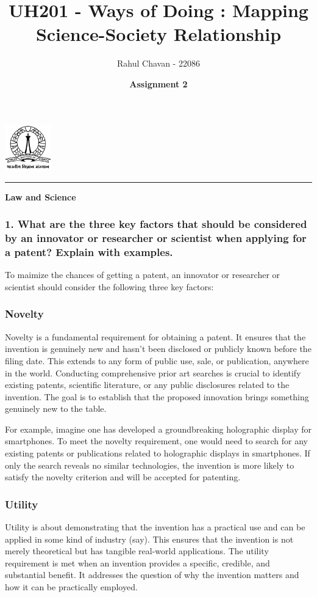 \documentclass{report}
\title{\textbf{UH201 - Ways of Doing : Mapping Science-Society Relationship}}
\author{Rahul Chavan - 22086}
\date{\textbf{Assignment 2}}
\renewcommand{\maketitle}{
 \begin{center}
    \includegraphics[width=2cm]{IISc_Master_Seal_Black.jpg}
    \vspace{0.5cm}

    \Large
    \textbf{\thetitle}
    
    \vspace{0.5cm}
    
    \Large
    \theauthor
    
    \vspace{0.2cm}
    
    \large
    \thedate

    \vspace{0.5cm}

    \hrule  
    
  \end{center}
}
\begin{document}
\maketitle
\begin{center}
    \Large
    \textbf{Law and Science}
\end{center} 

\subsubsection*{1. What are the three key factors that should be considered by an
innovator or researcher or scientist when applying for a patent?
Explain with examples.}

To maimize the chances of getting a patent, an innovator or researcher or scientist should consider the following three key factors:

\subsubsection*{Novelty}
Novelty is a fundamental requirement for obtaining a patent. It ensures that the invention is genuinely new and hasn't 
been disclosed or publicly known before the filing date. This extends to any form of public use, sale, or publication, 
anywhere in the world. Conducting comprehensive prior art searches is crucial to identify existing patents, scientific 
literature, or any public disclosures related to the invention. The goal is to establish that the proposed innovation 
brings something genuinely new to the table.

For example, imagine one has developed a groundbreaking holographic display for smartphones. To meet the novelty 
requirement, one would need to search for any existing patents or publications related to holographic displays in 
smartphones. If only the search reveals no similar technologies, the invention is more likely to satisfy the novelty criterion and will be 
accepted for patenting.

\subsubsection*{Utility}
Utility is about demonstrating that the invention has a practical use and can be applied in some kind of industry (say). 
This ensures that the invention is not merely theoretical but has tangible real-world applications. The utility 
requirement is met when an invention provides a specific, credible, and substantial benefit. It addresses the 
question of why the invention matters and how it can be practically employed.
\end{document}

